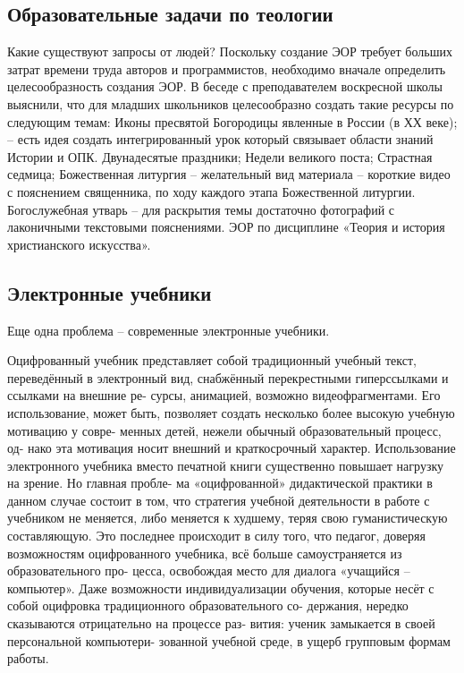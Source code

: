 \subsection{Образовательные задачи по теологии}

Какие существуют запросы от людей?
Поскольку создание ЭОР требует больших затрат времени труда авторов и программистов, необходимо вначале определить целесообразность создания ЭОР. В беседе с преподавателем воскресной школы выяснили, что для младших школьников целесообразно создать такие ресурсы по следующим темам:
Иконы пресвятой Богородицы явленные в России (в ХХ веке); – есть идея создать интегрированный урок который связывает области знаний Истории и ОПК.
Двунадесятые праздники;
Недели великого поста;
Страстная седмица;
Божественная литургия – желательный вид материала – короткие видео с пояснением священника, по ходу каждого этапа Божественной литургии.
Богослужебная утварь – для раскрытия темы достаточно фотографий с лаконичными текстовыми пояснениями.
ЭОР по дисциплине «Теория и история христианского искусства».


\subsection{Электронные учебники}
Еще одна проблема -- современные электронные учебники. 



Оцифрованный учебник представляет собой традиционный учебный текст, переведённый в электронный вид, снабжённый перекрестными гиперссылками и ссылками на внешние ре-
сурсы, анимацией, возможно видеофрагментами. Его использование, может быть, позволяет создать несколько более высокую учебную мотивацию у совре-
менных детей, нежели обычный образовательный процесс, од-
нако эта мотивация носит внешний и краткосрочный характер.
Использование электронного учебника вместо печатной книги
существенно повышает нагрузку на зрение. Но главная пробле-
ма «оцифрованной» дидактической практики в данном случае
состоит в том, что стратегия учебной деятельности в работе с
учебником не меняется, либо меняется к худшему, теряя свою
гуманистическую составляющую. Это последнее происходит в
силу того, что педагог, доверяя возможностям оцифрованного
учебника, всё больше самоустраняется из образовательного про-
цесса, освобождая место для диалога «учащийся – компьютер».
Даже возможности индивидуализации обучения, которые
несёт с собой оцифровка традиционного образовательного со-
держания, нередко сказываются отрицательно на процессе раз-
вития: ученик замыкается в своей персональной компьютери-
зованной учебной среде, в ущерб групповым формам работы.

